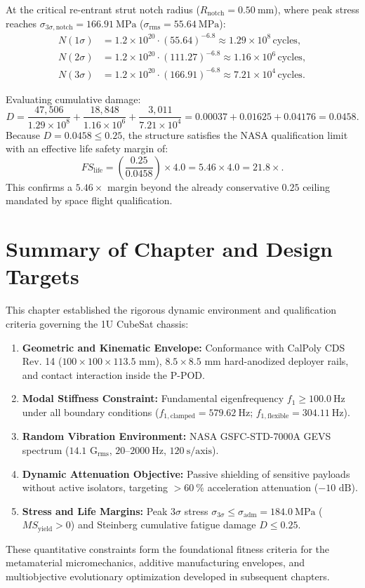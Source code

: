 At the critical re-entrant strut notch radius ($R_{\text{notch}} = \SI{0.50}{\milli\meter}$), where peak stress reaches $\sigma_{3\sigma,\text{notch}} = \SI{166.91}{\mega\pascal}$ ($\sigma_{\text{rms}} = \SI{55.64}{\mega\pascal}$):
\begin{align}
N(1\sigma) &= 1.2 \times 10^{20} \cdot (55.64)^{-6.8} \approx 1.29 \times 10^8\,\text{cycles}, \\
N(2\sigma) &= 1.2 \times 10^{20} \cdot (111.27)^{-6.8} \approx 1.16 \times 10^6\,\text{cycles}, \\
N(3\sigma) &= 1.2 \times 10^{20} \cdot (166.91)^{-6.8} \approx 7.21 \times 10^4\,\text{cycles}.
\end{align}

Evaluating cumulative damage:
\begin{equation}
D = \frac{47{,}506}{1.29 \times 10^8} + \frac{18{,}848}{1.16 \times 10^6} + \frac{3{,}011}{7.21 \times 10^4} = 0.00037 + 0.01625 + 0.04176 = \mathbf{0.0458}.
\label{eq:damage_evaluated}
\end{equation}
Because $D = 0.0458 \le 0.25$, the structure satisfies the NASA qualification limit with an effective life safety margin of:
\begin{equation}
FS_{\text{life}} = \left(\frac{0.25}{0.0458}\right) \times 4.0 = 5.46 \times 4.0 = \mathbf{21.8\times}.
\label{eq:safety_factor_life}
\end{equation}
This confirms a $5.46\times$ margin beyond the already conservative $0.25$ ceiling mandated by space flight qualification.

\section{Summary of Chapter and Design Targets}
\label{sec:ch1_summary}

This chapter established the rigorous dynamic environment and qualification criteria governing the 1U CubeSat chassis:
\begin{enumerate}
\item \textbf{Geometric and Kinematic Envelope:} Conformance with CalPoly CDS Rev. 14 ($100 \times 100 \times 113.5\text{ mm}$), $8.5 \times 8.5\text{ mm}$ hard-anodized deployer rails, and contact interaction inside the P-POD.
\item \textbf{Modal Stiffness Constraint:} Fundamental eigenfrequency $f_1 \ge \SI{100.0}{\hertz}$ under all boundary conditions ($f_{1,\text{clamped}} = \SI{579.62}{\hertz}$; $f_{1,\text{flexible}} = \SI{304.11}{\hertz}$).
\item \textbf{Random Vibration Environment:} NASA GSFC-STD-7000A GEVS spectrum ($14.1\text{ G}_{\text{rms}}$, $20\text{--}\SI{2000}{\hertz}$, $\SI{120}{\second}/\text{axis}$).
\item \textbf{Dynamic Attenuation Objective:} Passive shielding of sensitive payloads without active isolators, targeting $> \SI{60}{\percent}$ acceleration attenuation ($-10\text{ dB}$).
\item \textbf{Stress and Life Margins:} Peak $3\sigma$ stress $\sigma_{3\sigma} \le \sigma_{\text{adm}} = \SI{184.0}{\mega\pascal}$ ($MS_{\text{yield}} > 0$) and Steinberg cumulative fatigue damage $D \le 0.25$.
\end{enumerate}

These quantitative constraints form the foundational fitness criteria for the metamaterial micromechanics, additive manufacturing envelopes, and multiobjective evolutionary optimization developed in subsequent chapters.
